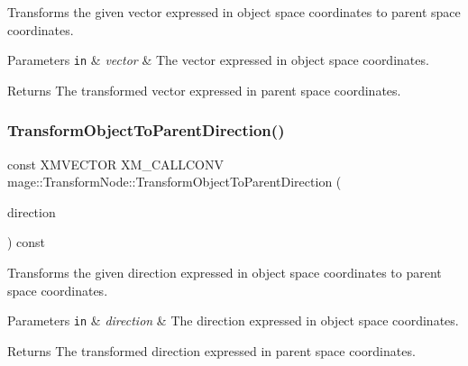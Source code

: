 Transforms the given vector expressed in object space coordinates to parent space coordinates.


\begin{DoxyParams}[1]{Parameters}
\mbox{\tt in}  & {\em vector} & The vector expressed in object space coordinates. \\
\hline
\end{DoxyParams}
\begin{DoxyReturn}{Returns}
The transformed vector expressed in parent space coordinates. 
\end{DoxyReturn}
\hypertarget{classmage_1_1_transform_node_af3f7d31eeb595ac51fe2362c91688398}{}\label{classmage_1_1_transform_node_af3f7d31eeb595ac51fe2362c91688398} 
\subsubsection{\texorpdfstring{Transform\+Object\+To\+Parent\+Direction()}{TransformObjectToParentDirection()}}
{\footnotesize\ttfamily const X\+M\+V\+E\+C\+T\+OR X\+M\+\_\+\+C\+A\+L\+L\+C\+O\+NV mage\+::\+Transform\+Node\+::\+Transform\+Object\+To\+Parent\+Direction (\begin{DoxyParamCaption}\item[{F\+X\+M\+V\+E\+C\+T\+OR}]{direction }\end{DoxyParamCaption}) const\hspace{0.3cm}{\ttfamily [noexcept]}}

Transforms the given direction expressed in object space coordinates to parent space coordinates.


\begin{DoxyParams}[1]{Parameters}
\mbox{\tt in}  & {\em direction} & The direction expressed in object space coordinates. \\
\hline
\end{DoxyParams}
\begin{DoxyReturn}{Returns}
The transformed direction expressed in parent space coordinates. 
\end{DoxyReturn}
\hypertarget{classmage_1_1_transform_node_a449428a24f76ca18b91f84ba3e69c0f3}{}\label{classmage_1_1_transform_node_a449428a24f76ca18b91f84ba3e69c0f3} 
